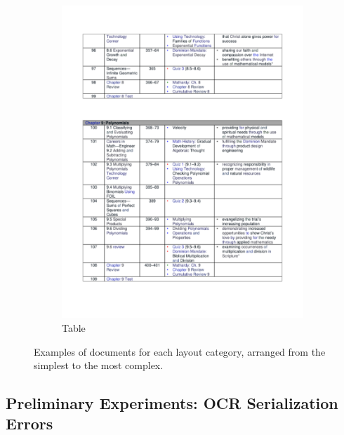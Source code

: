 \begin{figure}[ht]
\begin{subfigure}[b]{0.24\textwidth}
      \includegraphics[width=\textwidth]{images/chapter4/tables.pdf}
      \caption{Table}
    \end{subfigure}
  \caption{Examples of documents for each layout category, arranged from the simplest to the most complex.}
  \label{fig:layout-examples}
\end{figure}

\subsection{Preliminary Experiments: OCR Serialization Errors}

